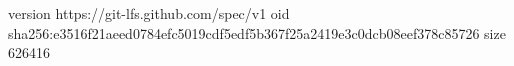 version https://git-lfs.github.com/spec/v1
oid sha256:e3516f21aeed0784efc5019cdf5edf5b367f25a2419e3c0dcb08eef378c85726
size 626416

